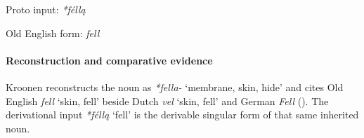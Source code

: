 \documentclass[
  british,
  a4paper,
]{article}
\providecommand{\Recon}[1]{\emph{*#1}}
\begin{document}
Proto input: \emph{*féllą}

\begingroup
\setlength{\fboxsep}{6pt}

\noindent{} \endgroup

Old English form: \emph{fell}

\paragraph{Reconstruction and comparative
evidence}\label{reconstruction-and-comparative-evidence-16}

Kroonen reconstructs the noun as \emph{*fella-} `membrane, skin, hide'
and cites Old English {\emph{fell}} `skin, fell' beside Dutch
{\emph{vel}} `skin, fell' and German \emph{Fell}
(). The derivational input
\Recon{féllą} `fell' is the derivable singular form of that same
inherited noun.
\end{document}
